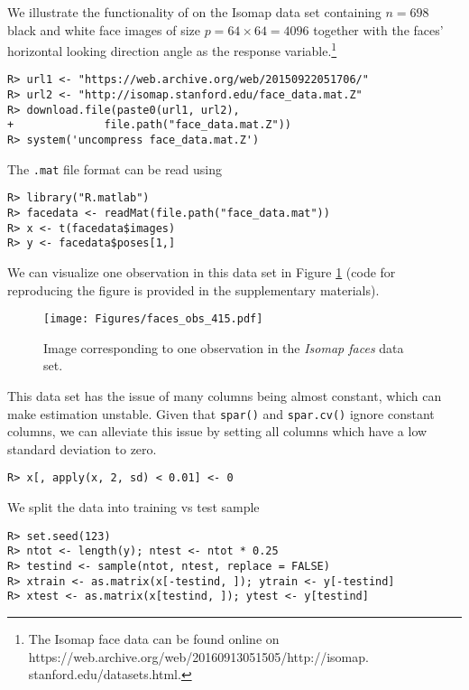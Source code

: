 \documentclass[
  article]{jss}
\begin{document}
We illustrate the functionality of  on the Isomap data set
containing \(n = 698\) black and white face images of size
\(p = 64 \times 64 = 4096\) together with the faces' horizontal looking
direction angle as the response variable.\footnote{
The Isomap face data can be found online on https://web.archive.org/web/20160913051505/http://isomap.
stanford.edu/datasets.html.}

\begin{verbatim}
R> url1 <- "https://web.archive.org/web/20150922051706/"
R> url2 <- "http://isomap.stanford.edu/face_data.mat.Z"
R> download.file(paste0(url1, url2),
+              file.path("face_data.mat.Z"))
R> system('uncompress face_data.mat.Z')
\end{verbatim}

The \texttt{.mat} file format can be read using 
\citep{pkg:rmatlab}

\begin{verbatim}
R> library("R.matlab")
R> facedata <- readMat(file.path("face_data.mat"))
R> x <- t(facedata$images)
R> y <- facedata$poses[1,]
\end{verbatim}

We can visualize one observation in this data set in Figure
\ref{fig:facesplot1} (code for reproducing the figure is provided in the
supplementary materials).

\begin{figure}[t!]
\centering
\texttt{[image: Figures/faces\_obs\_415.pdf]}
\caption{Image corresponding to one observation in the \emph{Isomap faces} data set. \label{fig:facesplot1}}
\end{figure}

This data set has the issue of many columns being almost constant, which
can make estimation unstable. Given that \texttt{spar()} and
\texttt{spar.cv()} ignore constant columns, we can alleviate this issue
by setting all columns which have a low standard deviation to zero.

\begin{verbatim}
R> x[, apply(x, 2, sd) < 0.01] <- 0
\end{verbatim}

We split the data into training vs test sample

\begin{verbatim}
R> set.seed(123)
R> ntot <- length(y); ntest <- ntot * 0.25
R> testind <- sample(ntot, ntest, replace = FALSE)
R> xtrain <- as.matrix(x[-testind, ]); ytrain <- y[-testind]
R> xtest <- as.matrix(x[testind, ]); ytest <- y[testind]
\end{verbatim}
\end{document}
